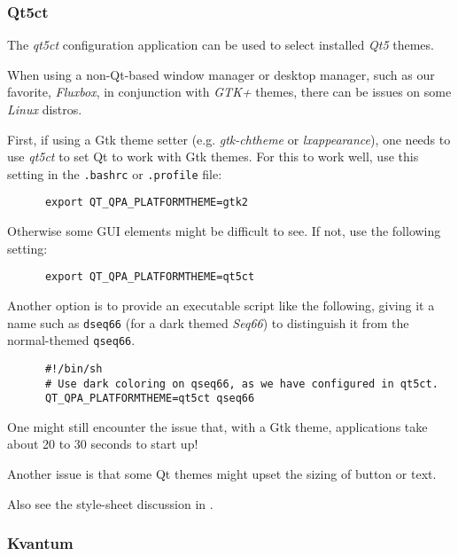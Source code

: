 \subsubsection{Qt5ct}
\label{subsubsec:palettes_theming_qt5ct}

   The \textsl{qt5ct} configuration application can be used to select installed
   \textsl{Qt5} themes.

   When using a non-Qt-based window manager or desktop manager, such as our
   favorite, \textsl{Fluxbox}, in conjunction with \textsl{GTK+} themes,
   there can be issues on some \textsl{Linux} distros.

   First, if using a Gtk theme setter (e.g. \textsl{gtk-chtheme}
   or \textsl{lxappearance}),
   one needs to
   use \textsl{qt5ct} to set Qt to work with Gtk themes.
   For this to work well, use this setting in the \texttt{.bashrc} or
   \texttt{.profile} file:

   \begin{verbatim}
      export QT_QPA_PLATFORMTHEME=gtk2
   \end{verbatim}

   Otherwise some GUI elements might be difficult to see.
   If not, use the following setting:

   \begin{verbatim}
      export QT_QPA_PLATFORMTHEME=qt5ct
   \end{verbatim}

   Another option is to provide an executable script like the following,
   giving it a name such as \texttt{dseq66}
   (for a dark themed \textsl{Seq66}) to
   distinguish it from the normal-themed \texttt{qseq66}.

   \begin{verbatim}
      #!/bin/sh
      # Use dark coloring on qseq66, as we have configured in qt5ct.
      QT_QPA_PLATFORMTHEME=qt5ct qseq66
   \end{verbatim}

   One might still encounter the issue that, with a Gtk theme, applications
   take about 20 to 30 seconds to start up!

   Another issue is that some Qt themes might upset the sizing of button or
   text.

   Also see the style-sheet discussion in
   .

\subsubsection{Kvantum}
\label{subsubsec:palettes_theming_kvantum}

